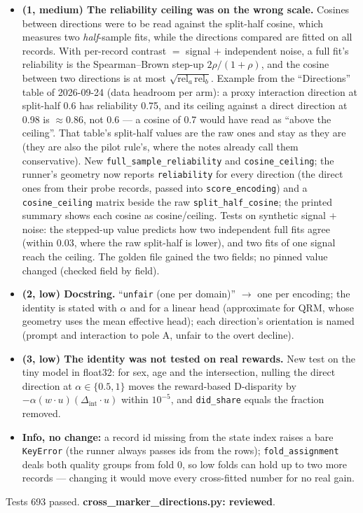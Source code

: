 \documentclass{article}
\begin{document}
\begin{itemize}
  \item \textbf{(1, medium) The reliability ceiling was on the wrong scale.} Cosines between directions were
        to be read against the split-half cosine, which measures two \emph{half}-sample fits, while the
        directions compared are fitted on all records. With per-record contrast $=$ signal $+$ independent noise,
        a full fit's reliability is the Spearman--Brown step-up $2\rho/(1+\rho)$, and the cosine between two
        directions is at most $\sqrt{\mathrm{rel}_a\,\mathrm{rel}_b}$. Example from the ``Directions'' table of 2026-09-24
        (data headroom per arm): a proxy interaction direction at split-half 0.6 has reliability 0.75, and its ceiling
        against a direct direction at 0.98 is $\approx0.86$, not 0.6 --- a cosine of 0.7 would have read as ``above
        the ceiling''. That table's split-half values are the raw ones and stay as they are (they are also the
        pilot rule's, where the notes already call them conservative). New \texttt{full\_sample\_reliability}
        and \texttt{cosine\_ceiling}; the runner's geometry now reports \texttt{reliability} for every direction
        (the direct ones from their probe records, passed into \texttt{score\_encoding}) and a
        \texttt{cosine\_ceiling} matrix beside the raw \texttt{split\_half\_cosine}; the printed summary shows each
        cosine as cosine/ceiling. Tests on synthetic signal $+$ noise: the stepped-up value predicts how two
        independent full fits agree (within 0.03, where the raw split-half is lower), and two fits of one signal
        reach the ceiling. The golden file gained the two fields; no pinned value changed (checked field by field).
  \item \textbf{(2, low) Docstring.} ``\texttt{unfair} (one per domain)'' $\to$ one per encoding; the identity is
        stated with $\alpha$ and for a linear head (approximate for QRM, whose geometry uses the mean effective
        head); each direction's orientation is named (prompt and interaction to pole A, unfair to the overt
        decline).
  \item \textbf{(3, low) The identity was not tested on real rewards.} New test on the tiny model in float32:
        for sex, age and the intersection, nulling the direct direction at $\alpha\in\{0.5,1\}$ moves the
        reward-based D-disparity by $-\alpha(w\cdot u)(\Delta_{\text{int}}\cdot u)$ within $10^{-5}$, and
        \texttt{did\_share} equals the fraction removed.
  \item \textbf{Info, no change:} a record id missing from the state index raises a bare \texttt{KeyError}
        (the runner always passes ids from the rows); \texttt{fold\_assignment} deals both quality groups from
        fold 0, so low folds can hold up to two more records --- changing it would move every cross-fitted
        number for no real gain.
\end{itemize}
Tests 693 passed. \textbf{cross\_marker\_directions.py: reviewed}.
\end{document}
